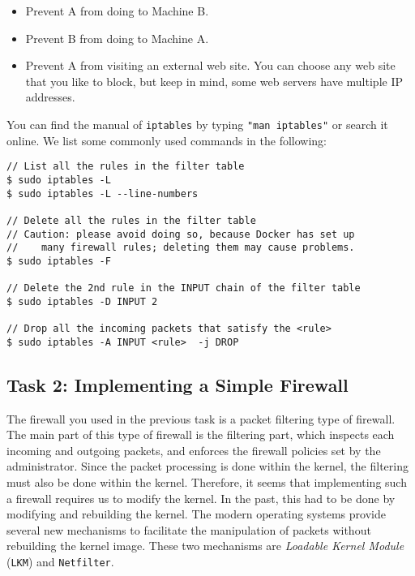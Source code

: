 \begin{itemize}
\item Prevent A from doing \telnet to Machine B.
\item Prevent B from doing \telnet to Machine A.
\item Prevent A from visiting an external web site. You can choose any web
site that you like to block, but keep in mind, some web servers have multiple
IP addresses. 
\end{itemize}


You can find the manual of {\tt iptables} by typing {\tt "man iptables"} or search it
online. We list some commonly used commands 
in the following:


\begin{lstlisting}
// List all the rules in the filter table
$ sudo iptables -L
$ sudo iptables -L --line-numbers

// Delete all the rules in the filter table
// Caution: please avoid doing so, because Docker has set up
//    many firewall rules; deleting them may cause problems.
$ sudo iptables -F

// Delete the 2nd rule in the INPUT chain of the filter table 
$ sudo iptables -D INPUT 2

// Drop all the incoming packets that satisfy the <rule>
$ sudo iptables -A INPUT <rule>  -j DROP
\end{lstlisting}
 


\subsection{Task 2: Implementing a Simple Firewall} 

The firewall you used in the previous task is a packet filtering 
type of firewall. The main part of this type of firewall is the filtering part, 
which inspects each incoming and outgoing packets, and enforces the firewall policies 
set by the administrator. Since the packet 
processing is done within the kernel, the filtering must also be 
done within the kernel. Therefore, it seems that implementing such
a firewall requires us to modify the \linux kernel. In the past, 
this had to be done by modifying and rebuilding 
the kernel. The modern \linux 
operating systems provide several new mechanisms 
to facilitate the manipulation of packets without rebuilding
the kernel image. These two mechanisms are 
\textit{Loadable Kernel Module} ({\tt LKM}) and {\tt Netfilter}.
 

